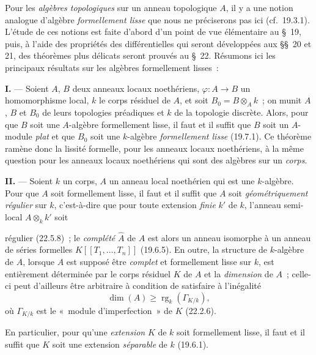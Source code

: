 \begin{env}[19.0.2]
\label{0.19.0.2-fr}
Pour les \emph{algèbres topologiques} sur un anneau topologique $A$, il y a une
notion analogue d'algèbre \emph{formellement lisse} que nous ne préciserons pas
ici (cf.~19.3.1). L'étude de ces notions est faite d'abord d'un point de vue
élémentaire au §~19, puis, à l'aide des propriétés des différentielles qui
seront développées aux §§~20 et 21, des théorèmes plus délicats seront prouvés
au §~22. Résumons ici les principaux résultats sur les algèbres formellement
lisses~:

\medskip\noindent\textbf{I.} --- Soient $A$, $B$ deux anneaux locaux
noethériens, $\varphi:A\to B$ un homomorphisme local, $k$ le corps résiduel de
$A$, et soit $B_0=B\otimes_A k$~; on munit $A$, $B$ et $B_0$ de leurs
topologies préadiques et $k$ de la topologie discrète. Alors, pour que $B$ soit
une $A$-algèbre formellement lisse, il faut et il suffit que $B$ soit un
$A$-module \emph{plat} et que $B_0$ soit une $k$-algèbre \emph{formellement
lisse} (19.7.1). Ce théorème ramène donc la lissité formelle, pour les anneaux
locaux noethériens, à la même question pour les anneaux locaux noethériens qui
sont des algèbres sur un \emph{corps}.

\medskip\noindent\textbf{II.} --- Soient $k$ un corps, $A$ un anneau local
noethérien qui est une $k$-algèbre. Pour que $A$ soit formellement lisse, il
faut et il suffit que $A$ soit \emph{géométriquement régulier} sur $k$,
c'est-à-dire que pour toute extension \emph{finie} $k'$ de $k$, l'anneau
semi-local $A\otimes_k k'$ soit


\noindent régulier (22.5.8)~; le \emph{complété} $\widehat A$ de $A$ est alors
un anneau isomorphe à un anneau de séries formelles
$K[[T_1,\ldots,T_n]]$ (19.6.5). En outre, la structure de $k$-algèbre de $A$,
lorsque $A$ est supposé être \emph{complet} et formellement lisse sur $k$, est
entièrement déterminée par le corps résiduel $K$ de $A$ et la \emph{dimension}
de $A$~; celle-ci peut d'ailleurs être arbitraire à condition de satisfaire à
l'inégalité
\[
  \dim(A)\geq \operatorname{rg}_k(\Gamma_{K/k}),
\]
où $\Gamma_{K/k}$ est le «~module d'imperfection~» de $K$ (22.2.6).

En particulier, pour qu'une \emph{extension} $K$ de $k$ soit formellement
lisse, il faut et il suffit que $K$ soit une extension \emph{séparable} de $k$
(19.6.1).


\end{env}
